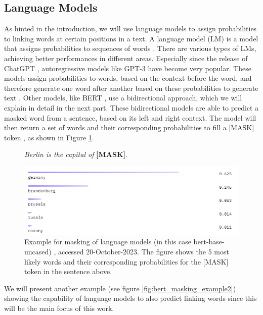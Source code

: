 \subsection{Language Models}
As hinted in the introduction, we will use language models to assign probabilities to linking words at certain positions in a text. A language model (LM) is a model that assigns probabilities to sequences of words \cite{languagemodels2023}. There are various types of LMs, achieving better performances in different areas. Especially since the release of ChatGPT \cite{chatgpt}, autoregressive models like GPT-3 have become very popular. These models assign probabilities to words, based on the context before the word, and therefore generate one word after another based on these probabilities to generate text \cite{gpt3}. Other models, like BERT \cite{bert}, use a bidirectional approach, which we will explain in detail in the next part. These bidirectional models are able to predict a masked word from a sentence, based on its left and right context. The model will then return a set of words and their corresponding probabilities to fill a [MASK] token \cite{bert}, as shown in Figure \ref{fig:bert_masking_example}.

\begin{figure}[H]
  \begin{center}
	\textit{Berlin is the capital of} \textbf{[MASK]}.
  \end{center}
  \centering
  \includegraphics[scale=0.9]{fig/bert_masking_example.png}
  \caption{Example for masking of language models (in this case bert-base-uncased) \cite{bertbaseuncased}, accessed 20-October-2023. The figure shows the 5 most likely words and their corresponding probabilities for the [MASK] token in the sentence above.}%
  \label{fig:bert_masking_example}
\end{figure}

We will present another example (see figure \ref{fig:bert_masking_example2}) showing the capability of language models to also predict linking words since this will be the main focus of this work.

